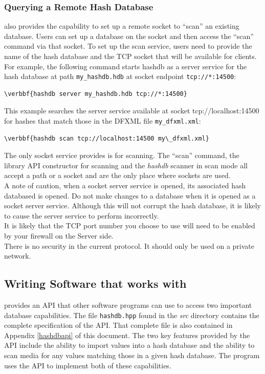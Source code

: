 \documentclass[11pt,fleqn]{article} %
\begin{document}
\subsubsection{Querying a Remote Hash Database}
\hash also provides the capability to set up a remote socket to ``scan'' an existing database. Users can set up a database on the socket and then access the ``scan'' command via that socket. To set up the scan service, users need to provide the name of the hash database and the TCP socket that will be available for clients.
For example, the following command
starts hashdb as a server service for the hash database at path \texttt{my\_hashdb.hdb} at socket endpoint \texttt{tcp://*:14500}:
 \begin{Verbatim}[commandchars=\\\{\}]
\verbbf{hashdb server my_hashdb.hdb tcp://*:14500}
\end{Verbatim} 

This example searches
the \hash server service available at socket tcp://localhost:14500 for hashes that match those in the DFXML file \texttt{my\_dfxml.xml}:
\begin{Verbatim}[commandchars=\\\{\}]
\verbbf{hashdb scan tcp://localhost:14500 my\_dfxml.xml}
\end{Verbatim} 

The only socket service \hash provides is for scanning. The \hash ``scan'' command, the \hash library API constructor for scanning and the \bulk \textit{hashdb} scanner in scan mode all accept a path or a socket and are the only place where sockets are used.\\

A note of caution, when a socket server service is opened, its associated hash databased is opened. Do not make changes to a database when it is opened as a socket server service. Although this will not corrupt the hash database, it is likely to cause the server service to perform incorrectly.\\

It is likely that the TCP port number you choose to use will need to be enabled by your firewall on the Server side.\\

There is no security in the current protocol. It should only be used on a private network.

\subsection{Writing Software that works with \hash}
\label{APISection}
\hash provides an API that other software programs can use to access two important database capabilities. The file \texttt{hashdb.hpp} found in the \textit{src} directory contains the complete specification of the API. That complete file is also contained in Appendix \ref{hashdbapi} of this document.  The two key features provided by the API include the ability to import values into a hash database and the ability to scan media for any values matching those in a given hash database.  The \bulk program uses the \hash API to implement both of these capabilities.\\
\end{document}
